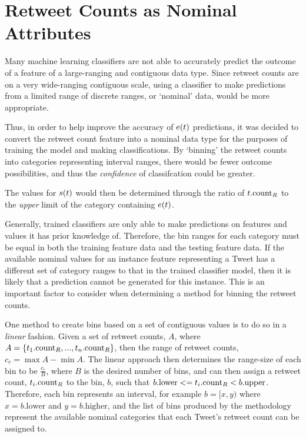 \section{Retweet Counts as Nominal Attributes}
Many machine learning classifiers are not able to accurately predict the outcome of a feature of a large-ranging and contiguous data type. Since retweet counts are on a very wide-ranging contiguous scale, using a classifier to make predictions from a limited range of discrete ranges, or `nominal' data, would be more appropriate.

Thus, in order to help improve the accuracy of $e(t)$ predictions, it was decided to convert the retweet count feature into a nominal data type for the purposes of training the model and making classifications. By `binning' the retweet counts into categories representing interval ranges, there would be fewer outcome possibilities, and thus the \textit{confidence} of classifcation could be greater.

The values for $s(t)$ would then be determined through the ratio of $t.\textrm{count}_R$ to the \textit{upper} limit of the category containing $e(t)$.

Generally, trained classifiers are only able to make predictions on features and values it has prior knowledge of. Therefore, the bin ranges for each category must be equal in both the training feature data and the testing feature data. If the available nominal values for an instance feature representing a Tweet has a different set of category ranges to that in the trained classifier model, then it is likely that a prediction cannot be generated for this instance. This is an important factor to consider when determining a method for binning the retweet counts.

One method to create bins based on a set of contiguous values is to do so in a \textit{linear} fashion. Given a set of retweet counts, $A$, where $A = \left\{t_1.\textrm{count}_R, ..., t_n.\textrm{count}_R\right\}$, then the range of retweet counts, $c_r = \max{A} - \min{A}$. The linear approach then determines the range-size of each bin to be $\frac{c_r}{B}$, where $B$ is the desired number of bins, and can then assign a retweet count, $t_i.\textrm{count}_R$ to the bin, $b$, such that $b.\textrm{lower} <= t_i.\textrm{count}_R < b.\textrm{upper}$. Therefore, each bin represents an interval, for example $b = [x,y)$ where $x = b.\textrm{lower}$ and $y = b.\textrm{higher}$, and the list of bins produced by the methodology represent the available nominal categories that each Tweet's retweet count can be assigned to.

